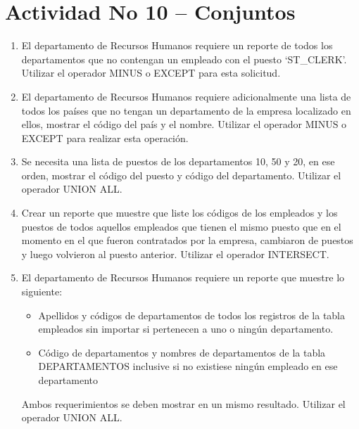 \section{Actividad No 10 – Conjuntos} 
		
\begin{enumerate}[1.]
	\item El departamento de Recursos Humanos requiere un reporte de todos los departamentos que no contengan un empleado con el puesto ‘ST\_CLERK’. Utilizar el operador MINUS o EXCEPT para esta solicitud.
	\item El departamento de Recursos Humanos requiere adicionalmente una lista de todos los pa\'ises que no tengan un departamento de la empresa localizado en ellos, mostrar el código del país y el nombre. Utilizar el operador MINUS o EXCEPT para realizar esta operaci\'on.
	\item Se necesita una lista de puestos de los departamentos 10, 50 y 20, en ese orden, mostrar el c\'odigo del puesto y c\'odigo del departamento. Utilizar el operador UNION ALL.
	\item Crear un reporte que muestre que liste los c\'odigos de los empleados y los puestos de todos aquellos empleados que tienen el mismo puesto que en el momento en el que fueron contratados por la empresa, cambiaron de puestos y luego volvieron al puesto anterior. Utilizar el operador INTERSECT.
	\item El departamento de Recursos Humanos requiere un reporte que muestre lo siguiente:
	\begin{itemize}
		\item Apellidos y c\'odigos de departamentos de todos los registros de la tabla empleados sin importar si pertenecen a uno o ningún departamento.
		\item C\'odigo de departamentos y nombres de departamentos de la tabla DEPARTAMENTOS inclusive si no existiese ningún empleado en ese departamento
	\end{itemize}
	Ambos requerimientos se deben mostrar en un mismo resultado. Utilizar el operador UNION ALL.
\end{enumerate}

